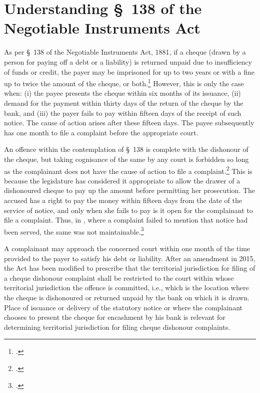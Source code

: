 \section{Understanding \S~138 of the Negotiable Instruments Act} \label{app:understanding}

As per \S~138 of the Negotiable Instruments Act, 1881, if a cheque (drawn by a person for paying off a debt or a liability) is returned unpaid due to insufficiency of funds or credit, the payer may be imprisoned for up to two years or with a fine up to twice the amount of the cheque, or both.\footcite[A \textit{cheque} is defined as per \S~6 of the NI Act. It is a bill of exchange drawn on a specified banker and not expressed to be payable otherwise than on-demand. It includes the electronic image of a truncated cheque and a cheque in electronic form. Once a cheque has been signed and issued in favour of the holder of the cheque, there is a statutory presumption \S~139 of NI Act that the cheque is issued in discharge of a legally enforceable debt or liability. However, said presumption is a rebuttable one. The issuer of the cheque can rebut that presumption by adducing credible evidence that the cheque was issued for some other purpose like security for a loan.][]{sc2018_murugun} However, this is only the case when: (i) the payee presents the cheque within six months of its issuance, (ii) demand for the payment within thirty days of the return of the cheque by the bank, and (iii) the payer fails to pay within fifteen days of the receipt of such notice. The cause of action arises after these fifteen days. The payee subsequently has one month to file a complaint before the appropriate court.

An offence within the contemplation of \S~138 is complete with the dishonour of the cheque, but taking cognisance of the same by any court is forbidden so long as the complainant does not have the cause of action to file a complaint.\footcite{sc2014_dashrath} This is because the legislature has considered it appropriate to allow the drawer of a dishonoured cheque to pay up the amount before permitting her prosecution. The accused has a right to pay the money within fifteen days from the date of the service of notice, and only when she fails to pay is it open for the complainant to file a complaint. Thus, in , where a complaint failed to mention that notice had been served, the same was not maintainable.\footcite{sc2002_shakti}

A complainant may approach the concerned court within one month of the time provided to the payer to satisfy his debt or liability. After an amendment in 2015, the Act has been modified to prescribe that the territorial jurisdiction for filing of a cheque dishonour complaint shall be restricted to the court within whose territorial jurisdiction the offence is committed, i.e., which is the location where the cheque is dishonoured or returned unpaid by the bank on which it is drawn. Place of issuance or delivery of the statutory notice or where the complainant chooses to present the cheque for encashment by his bank is relevant for determining territorial jurisdiction for filing cheque dishonour complaints.

